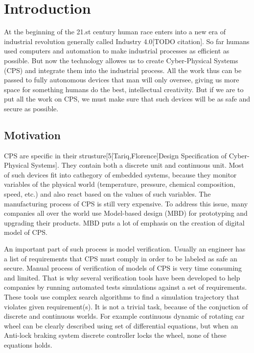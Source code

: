 \chapter{Introduction}
\enlargethispage*{5pt}

At the beginning of the 21.st century human race enters into a new era of industrial revolution generally called Industry 4.0[TODO citation]. So far humans used computers and automation to make industrial processes as efficient as possible. But now the technology allowes us to create Cyber-Physical Systems (CPS) and integrate them into the industrial process. All the work thus can be passed to fully autonomous devices that man will only oversee, giving us more space for something humans do the best, intellectual creativity. But if we are to put all the work on CPS, we must make sure that such devices will be as safe and secure as possible.

\section{Motivation}
CPS are specific in their strusture[5[Tariq,Florence]Design Specification of Cyber-Physical Systems]. They contain both a discrete unit and continuous unit. Most of such devices fit into cathegory of embedded systems, because they monitor variables of the physical world (temperature, pressure, chemical composition, speed, etc.) and also react based on the values of such variables. The manufacturing process of CPS is still very expensive. To address this issue, many companies all over the world use Model-based design (MBD) for prototyping and upgrading their products. MBD puts a lot of emphasis on the creation of digital model of CPS.

An important part of such process is model verification. Usually an engineer has a list of requirements that CPS must comply in order to be labeled as safe an secure. Manual process of verification of models of CPS is very time consuming and limited. That is why several verification tools have been developed to help companies by running automated tests simulations against a set of requirements. These tools use complex search algorithms to find a simulation trajectory that violates given requirement(s). It is not a trivial task, because of the conjuction of discrete and continuous worlds. For example continuous dynamic of rotating car wheel can be clearly described using set of differential equations, but when an Anti-lock braking system discrete controller locks the wheel, none of these equations holds.

